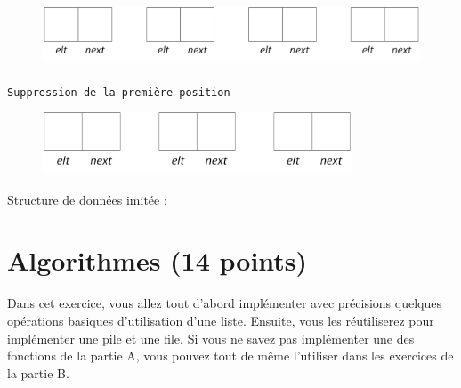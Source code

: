 \documentclass[11pt,a4paper]{article}
\begin{document}
\begin{center}
\begin{figure}[ht!]
\centering
\centerline{  %
\includegraphics[height=1.85cm]{img/Liste_p_vide_4.png}
}
\end{figure}


\texttt{Suppression de la première position}

\begin{figure}[ht!]
\centering
\centerline{  %
\includegraphics[height=1.85cm]{img/Liste_p_vide_3.png}
}
\end{figure}

\bigskip

\end{center}

Structure de données imitée :

\bigskip



\newpage

%
\section{Algorithmes (14 points)}

%
%

Dans cet exercice, vous allez tout d'abord implémenter avec précisions quelques opérations basiques d'utilisation d'une liste.
Ensuite, vous les réutiliserez pour implémenter une pile et une file.
Si vous ne savez pas implémenter une des fonctions de la partie A, vous pouvez tout de même l'utiliser dans les exercices de la partie B.
\end{document}
